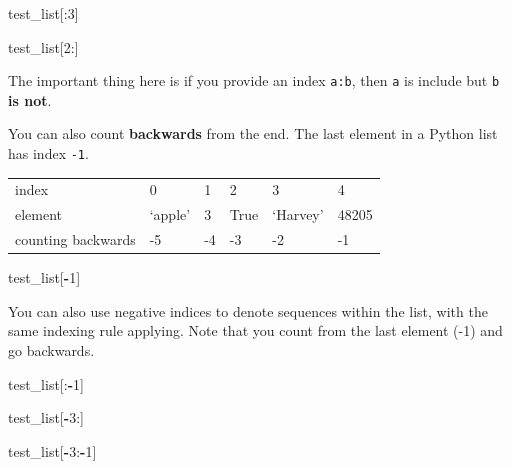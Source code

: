 \documentclass[
  letterpaper,
]{scrbook}
\newenvironment{Shaded}{\begin{snugshade}}{\end{snugshade}}
\newcommand{\DecValTok}[1]{\textcolor[rgb]{0.00,0.00,0.81}{#1}}
\newcommand{\NormalTok}[1]{#1}
\newcommand{\OperatorTok}[1]{\textcolor[rgb]{0.81,0.36,0.00}{\textbf{#1}}}
\begin{document}
\begin{Shaded}
\begin{Highlighting}[]
\NormalTok{test\_list[:}\DecValTok{3}\NormalTok{]}
\end{Highlighting}
\end{Shaded}

\begin{Shaded}
\begin{Highlighting}[]
\NormalTok{test\_list[}\DecValTok{2}\NormalTok{:]}
\end{Highlighting}
\end{Shaded}

The important thing here is if you provide an index \texttt{a:b}, then \texttt{a} is include but \texttt{b} \textbf{is not}.

You can also count \textbf{backwards} from the end. The last element in a Python list has index \texttt{-1}.

\begin{longtable}[]{@{}llllll@{}}
\toprule
\endhead
index & 0 & 1 & 2 & 3 & 4\tabularnewline
element & `apple' & 3 & True & `Harvey' & 48205\tabularnewline
counting backwards & -5 & -4 & -3 & -2 & -1\tabularnewline
\bottomrule
\end{longtable}

\begin{Shaded}
\begin{Highlighting}[]
\NormalTok{test\_list[}\OperatorTok{{-}}\DecValTok{1}\NormalTok{]}
\end{Highlighting}
\end{Shaded}

You can also use negative indices to denote sequences within the list, with the same indexing rule applying. Note that you count from the last element (-1) and go backwards.

\begin{Shaded}
\begin{Highlighting}[]
\NormalTok{test\_list[:}\OperatorTok{{-}}\DecValTok{1}\NormalTok{]}
\end{Highlighting}
\end{Shaded}

\begin{Shaded}
\begin{Highlighting}[]
\NormalTok{test\_list[}\OperatorTok{{-}}\DecValTok{3}\NormalTok{:]}
\end{Highlighting}
\end{Shaded}

\begin{Shaded}
\begin{Highlighting}[]
\NormalTok{test\_list[}\OperatorTok{{-}}\DecValTok{3}\NormalTok{:}\OperatorTok{{-}}\DecValTok{1}\NormalTok{]}
\end{Highlighting}
\end{Shaded}
\end{document}
